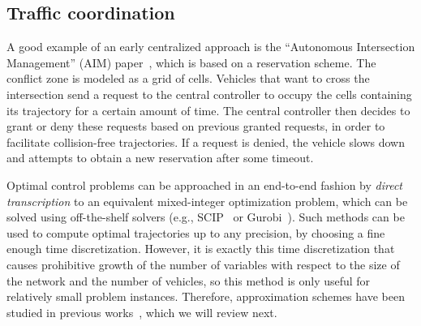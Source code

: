 \documentclass{article}
\theoremstyle{definition}
\theoremstyle{plain}
\begin{document}
\subsection{Traffic coordination}

A good example of an early centralized approach is the ``Autonomous Intersection
Management'' (AIM) paper~\cite{dresnerMultiagentApproachAutonomous2008}, which
is based on a reservation scheme. The conflict zone is modeled as a grid of
cells. Vehicles that want to cross the intersection send a request to the
central controller to occupy the cells containing its trajectory for a certain
amount of time. The central controller then decides to grant or deny these
requests based on previous granted requests, in order to facilitate
collision-free trajectories. If a request is denied, the vehicle slows down and
attempts to obtain a new reservation after some timeout.

Optimal control problems can be approached in an end-to-end fashion by
\textit{direct transcription} to an equivalent mixed-integer optimization
problem, which can be solved using off-the-shelf solvers (e.g.,
SCIP~\cite{BolusaniEtal2024OO} or Gurobi~\cite{gurobi}). Such methods can be
used to compute optimal trajectories up to any precision, by choosing a fine
enough time discretization. However, it is exactly this time discretization that
causes prohibitive growth of the number of variables with respect to the size of
the network and the number of vehicles, so this method is only useful for relatively
small problem instances.
%
Therefore, approximation schemes have been studied in previous
works~\cite{hultApproximateSolutionOptimal2015,zhaoBilevelProgrammingModel2021,tallapragadaHierarchicaldistributedOptimizedCoordination2017}, which we will review next.
\end{document}
